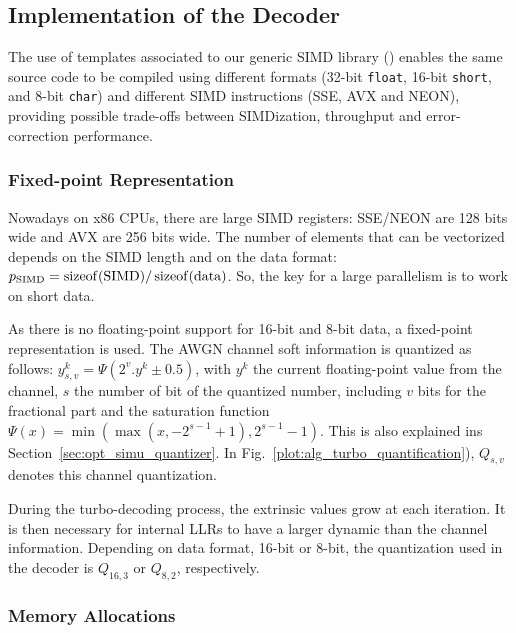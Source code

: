\subsection{Implementation of the Decoder}
\label{sec:turbo_implem}

The use of \Cxx templates associated to our generic SIMD library (\MIPP) enables
the same source code to be compiled using different formats (32-bit
\verb|float|, 16-bit \verb|short|, and 8-bit \verb|char|) and different SIMD
instructions (SSE, AVX and NEON), providing possible trade-offs between
SIMDization, throughput and error-correction performance.

\subsubsection{Fixed-point Representation}

Nowadays on x86 CPUs, there are large SIMD registers: SSE/NEON are 128 bits
wide and AVX are 256 bits wide. The number of elements that can be vectorized
depends on the SIMD length and on the data format:
$p_\text{SIMD} = \operatorname*{sizeof}(\text{SIMD}) / \operatorname*{sizeof}(\text{data})$. So, the key for a
large parallelism is to work on short data.

As there is no floating-point support for 16-bit and 8-bit data, a fixed-point
representation is used. The AWGN channel soft information is quantized as
follows: $y_{s,v}^k = \Psi(2^v . y^k \pm 0.5)$, with $y^k$ the current
floating-point value from the channel, $s$ the number of bit of the quantized
number, including $v$ bits for the fractional part and the saturation function
$\Psi(x) = \min(\max(x, -2^{s-1} +1), 2^{s-1} -1)$. This is also explained ins
Section~\ref{sec:opt_simu_quantizer}. In
Fig.~\ref{plot:alg_turbo_quantification}), $Q_{s,v}$ denotes this channel
quantization.

During the turbo-decoding process, the extrinsic values grow at each iteration.
It is then necessary for internal LLRs to have a larger dynamic than the channel
information. Depending on data format, 16-bit or 8-bit, the quantization used in
the decoder is $Q_{16,3}$ or $Q_{8,2}$, respectively.

\subsubsection{Memory Allocations}

